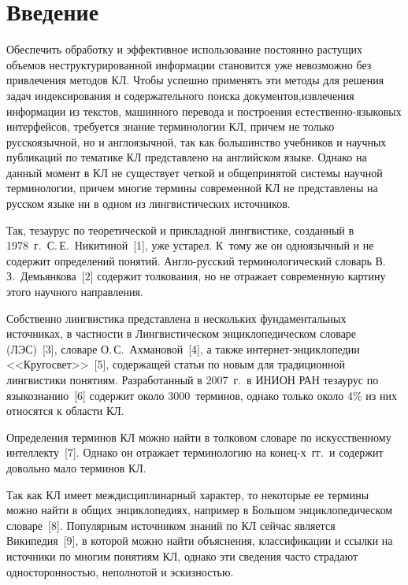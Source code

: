       \begin{multicols}{2}

            \label{st\stat}

\section{Введение}

  Обеспечить обработку и эффективное использование постоянно растущих объемов 
неструктурированной информации становится уже невозможно без привлечения методов 
КЛ. Чтобы успешно приме\-нять эти методы для решения задач 
индексирования и содержательного поиска документов,\linebreak извлече\-ния информации из текстов, 
машинного перевода и построения есте\-ст\-вен\-но-язы\-ко\-вых интерфейсов, требуется знание 
терминологии КЛ, причем не только русскоязычной, но и англоязычной, так как 
большинство учебников и научных публикаций по тематике КЛ представлено на английском 
языке. Однако на данный момент в КЛ не существует четкой и общепринятой системы 
научной терминологии, причем многие термины современной КЛ не представлены на 
русском языке ни в одном из лингвистических источников.
  
  Так, тезаурус по теоретической и прикладной лингвистике, созданный в 1978~г.\ 
С.\,Е.~Никитиной~[1], уже устарел. К~тому же он одноязычный и не содержит определений 
понятий. Англо-русский терминологический словарь В.\,З.~Демьянкова~[2] содержит 
толкования, но не отражает современную картину этого научного направления. 
  
  Собственно лингвистика представлена в нескольких фундаментальных источниках, в 
част\-ности в Лингвистическом энциклопедическом словаре (ЛЭС)~[3], словаре О.\,С.~Ахмановой~[4], а также интернет-энциклопедии 
<<Кругосвет>>~[5], содержащей статьи по новым для традиционной лингвистики понятиям. 
Разработанный в 2007~г.\ в ИНИОН РАН тезаурус по языкознанию~[6] содержит около 
3000~терминов, однако только около 4\% из них относятся к области КЛ.
  
  Определения терминов КЛ можно найти в толковом словаре по искусственному 
интеллекту~[7]. Однако он отражает терминологию на конец\linebreak 1980-х~гг.\ и содержит 
довольно мало терминов КЛ.
  
  Так как КЛ имеет междисциплинарный характер, то некоторые ее термины можно найти в 
общих энциклопедиях, например в Большом энциклопедическом словаре~[8]. Популярным источником знаний по КЛ сейчас 
является Википедия~[9], в которой можно найти объяснения, классификации и ссылки на 
источники по многим понятиям КЛ, однако эти сведения часто страдают односто\-рон\-ностью, 
неполнотой и эскизностью.
  

\end{multicols}
